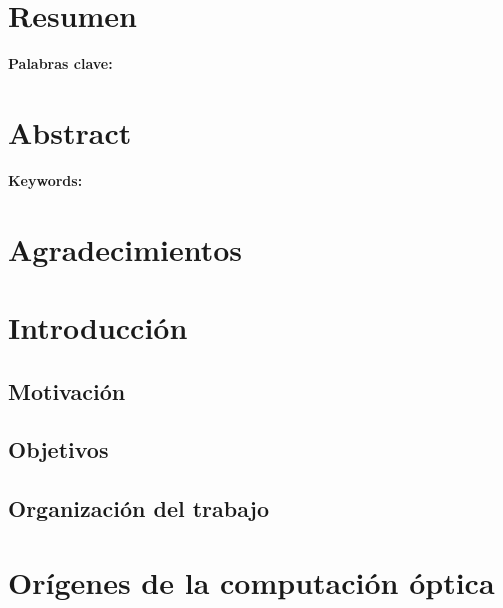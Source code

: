 \documentclass[12pt,a4paper]{report}
\begin{document}
\clearpage

\chapter*{Resumen}


\vspace{1cm}

\noindent\textbf{Palabras clave:}

\clearpage

\chapter*{Abstract}


\vspace{1cm}

\noindent\textbf{Keywords:}

\clearpage


\chapter*{Agradecimientos}


\clearpage

\tableofcontents
\clearpage

\chapter{Introducción}

\section{Motivación}

\section{Objetivos}

\section{Organización del trabajo}


\chapter{Orígenes de la computación óptica}
\end{document}
